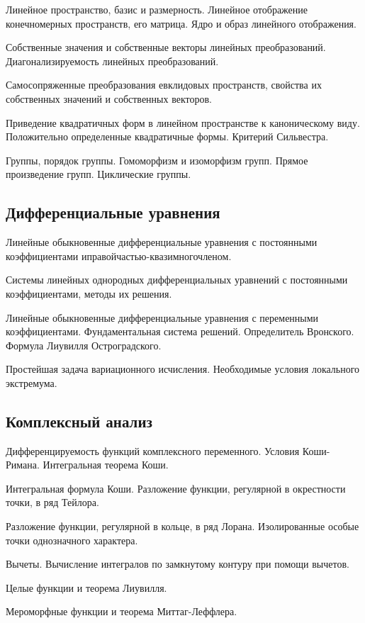 \begin{enumerate*}
\item Линейное пространство, базис и размерность. Линейное отображение конечномерных пространств, его матрица. Ядро и образ линейного отображения.
\item Собственные значения и собственные векторы линейных преобразований. Диагонализируемость линейных преобразований.
\item Самосопряженные преобразования евклидовых пространств, свойства их собственных значений и собственных векторов.
\item Приведение квадратичных форм в линейном пространстве к каноническому виду. Положительно определенные квадратичные формы. Критерий Сильвестра.
\item Группы, порядок группы. Гомоморфизм и изоморфизм групп. Прямое произведение групп. Циклические группы.



\subsection*{Дифференциальные уравнения}

\item Линейные обыкновенные дифференциальные уравнения с постоянными коэффициентами иправойчастью-квазимногочленом.
\item Системы линейных однородных дифференциальных уравнений с постоянными коэффициентами, методы их решения.
\item Линейные обыкновенные дифференциальные уравнения с переменными коэффициентами. Фундаментальная система решений. Определитель Вронского. Формула Лиувилля Остроградского.
\item Простейшая задача вариационного исчисления. Необходимые условия локального экстремума.



\subsection*{Комплексный анализ}

\item Дифференцируемость функций комплексного переменного. Условия Коши-Римана. Интегральная теорема Коши.
\item Интегральная формула Коши. Разложение функции, регулярной в окрестности точки, в ряд Тейлора.
\item Разложение функции, регулярной в кольце, в ряд Лорана. Изолированные особые точки однозначного характера.
\item Вычеты. Вычисление интегралов по замкнутому контуру при помощи вычетов.
\item Целые функции и теорема Лиувилля.
\item Мероморфные функции и теорема Миттаг-Леффлера.



\end{enumerate*}